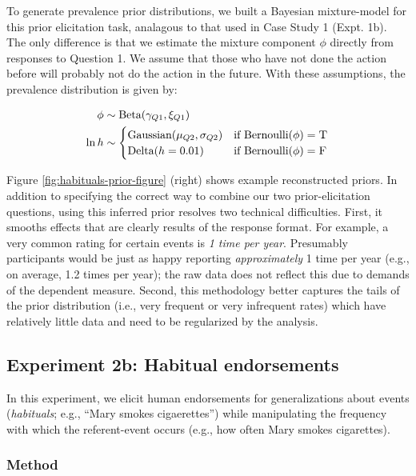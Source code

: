 \documentclass[english,floatsintext,man]{apa6}
\theoremstyle{definition}
\theoremstyle{definition}
\theoremstyle{definition}
\theoremstyle{remark}
\begin{document}
To generate prevalence prior distributions, we built a Bayesian
mixture-model for this prior elicitation task, analagous to that used in
Case Study 1 (Expt. 1b). The only difference is that we estimate the
mixture component \(\phi\) directly from responses to Question 1. We
assume that those who have not done the action before will probably not
do the action in the future. With these assumptions, the prevalence
distribution is given by:

\begin{align}
\phi & \sim \text{Beta}(\gamma_{Q1}, \xi_{Q1}) \nonumber \\ 
\ln h & \sim \begin{cases}
        \text{Gaussian}(\mu_{Q2}, \sigma_{Q2}) &\mbox{if } \text{Bernoulli}(\phi) = \textsc{T} \label{eq:priorModel}  \\
                \text{Delta}(h=0.01) &\mbox{if } \text{Bernoulli}(\phi) = \textsc{F} \\
        \end{cases}
\end{align}

Figure \ref{fig:habituals-prior-figure} (right) shows example
reconstructed priors. In addition to specifying the correct way to
combine our two prior-elicitation questions, using this inferred prior
resolves two technical difficulties. First, it smooths effects that are
clearly results of the response format. For example, a very common
rating for certain events is \emph{1 time per year}. Presumably
participants would be just as happy reporting \emph{approximately} 1
time per year (e.g., on average, 1.2 times per year); the raw data does
not reflect this due to demands of the dependent measure. Second, this
methodology better captures the tails of the prior distribution (i.e.,
very frequent or very infrequent rates) which have relatively little
data and need to be regularized by the analysis.

\subsection{Experiment 2b: Habitual
endorsements}\label{experiment-2b-habitual-endorsements}

In this experiment, we elicit human endorsements for generalizations
about events (\emph{habituals}; e.g., \enquote{Mary smokes cigaerettes})
while manipulating the frequency with which the referent-event occurs
(e.g., how often Mary smokes cigarettes).

\subsubsection{Method}\label{method-3}
\end{document}
